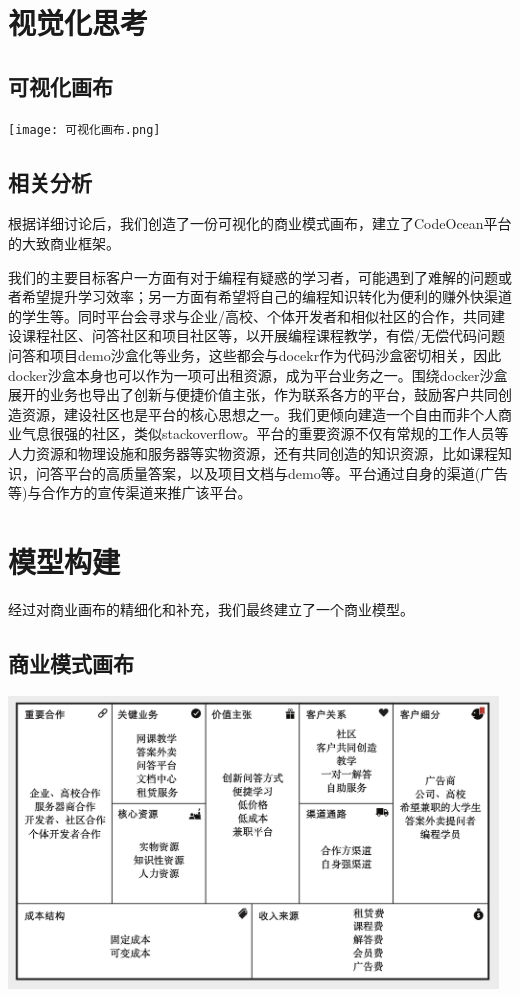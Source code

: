 \documentclass[a4paper]{ctexart}
\begin{document}
\section{视觉化思考}

\subsection{可视化画布}
\begin{center}
  \texttt{[image: 可视化画布.png]}
\end{center}

\subsection{相关分析}

根据详细讨论后，我们创造了一份可视化的商业模式画布，建立了CodeOcean平台的大致商业框架。

我们的主要目标客户一方面有对于编程有疑惑的学习者，可能遇到了难解的问题或者希望提升学习效率；另一方面有希望将自己的编程知识转化为便利的赚外快渠道的学生等。同时平台会寻求与企业/高校、个体开发者和相似社区的合作，共同建设课程社区、问答社区和项目社区等，以开展编程课程教学，有偿/无偿代码问题问答和项目demo沙盒化等业务，这些都会与docekr作为代码沙盒密切相关，因此docker沙盒本身也可以作为一项可出租资源，成为平台业务之一。围绕docker沙盒展开的业务也导出了创新与便捷价值主张，作为联系各方的平台，鼓励客户共同创造资源，建设社区也是平台的核心思想之一。我们更倾向建造一个自由而非个人商业气息很强的社区，类似stackoverflow。平台的重要资源不仅有常规的工作人员等人力资源和物理设施和服务器等实物资源，还有共同创造的知识资源，比如课程知识，问答平台的高质量答案，以及项目文档与demo等。平台通过自身的渠道(广告等)与合作方的宣传渠道来推广该平台。

\section{模型构建}

经过对商业画布的精细化和补充，我们最终建立了一个商业模型。

\subsection{商业模式画布}

\begin{center}
  \includegraphics[width=13cm]{canvas.png}
\end{center}
\end{document}
